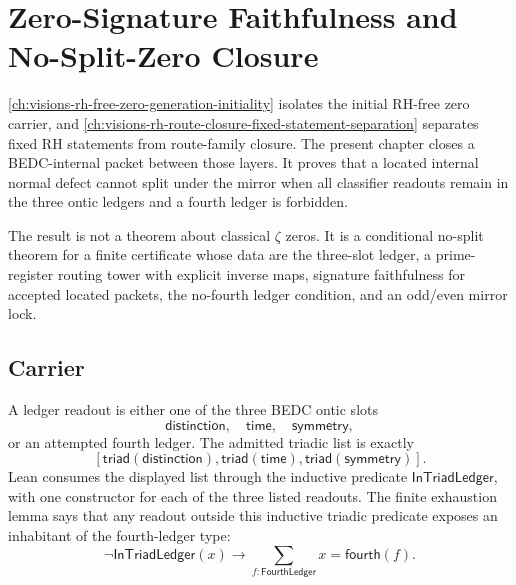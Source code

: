 \chapter{Zero-Signature Faithfulness and No-Split-Zero Closure}
\label{ch:visions-rh-zero-signature-faithfulness}

\autoref{ch:visions-rh-free-zero-generation-initiality} isolates the
initial RH-free zero carrier, and
\autoref{ch:visions-rh-route-closure-fixed-statement-separation} separates
fixed RH statements from route-family closure. The present chapter closes a
BEDC-internal packet between those layers. It proves that a located
internal normal defect cannot split under the mirror when all classifier
readouts remain in the three ontic ledgers and a fourth ledger is forbidden.

The result is not a theorem about classical $\zeta$ zeros. It is a
conditional no-split theorem for a finite certificate whose data are the
three-slot ledger, a prime-register routing tower with explicit inverse
maps, signature faithfulness for accepted located packets, the no-fourth
ledger condition, and an odd/even mirror lock.

\section{Carrier}
\label{sec:rh-zero-signature-faithfulness-carrier}

\begin{definition}
\label{def:rh-zero-signature-ledger-readout}
A ledger readout is either one of the three BEDC ontic slots
$$
\mathsf{distinction},\quad \mathsf{time},\quad \mathsf{symmetry},
$$
or an attempted fourth ledger. The admitted triadic list is exactly
$$
[
\mathsf{triad}(\mathsf{distinction}),
\mathsf{triad}(\mathsf{time}),
\mathsf{triad}(\mathsf{symmetry})
].
$$
Lean consumes the displayed list through the inductive predicate
$\mathsf{InTriadLedger}$, with one constructor for each of the three
listed readouts. The finite exhaustion lemma says that any readout outside
this inductive triadic predicate exposes an inhabitant of the
fourth-ledger type:
$$
\neg\mathsf{InTriadLedger}(x)
\to
\sum_{f:\mathsf{FourthLedger}}
x=\mathsf{fourth}(f).
$$
\end{definition}

